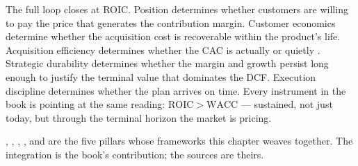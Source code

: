 The full loop closes at ROIC. Position determines whether customers are willing to pay the
price that generates the contribution margin. Customer economics determine whether the
acquisition cost is recoverable within the product's life. Acquisition efficiency determines
whether the CAC is actually  or quietly . Strategic durability
determines whether the margin and growth persist long enough to justify the terminal value
that dominates the DCF. Execution discipline determines whether the plan arrives on time.
Every instrument in the book is pointing at the same reading: \(\mathrm{ROIC}>\mathrm{WACC}\)
--- sustained, not just today, but through the terminal horizon the market is pricing.

\textcite{brealey2020}, \textcite{damodaran2012}, \textcite{gupta2004customer},
\textcite{porter1985}, and \textcite{osterwalder2010} are the five pillars whose frameworks
this chapter weaves together. The integration is the book's contribution; the sources are
theirs.
